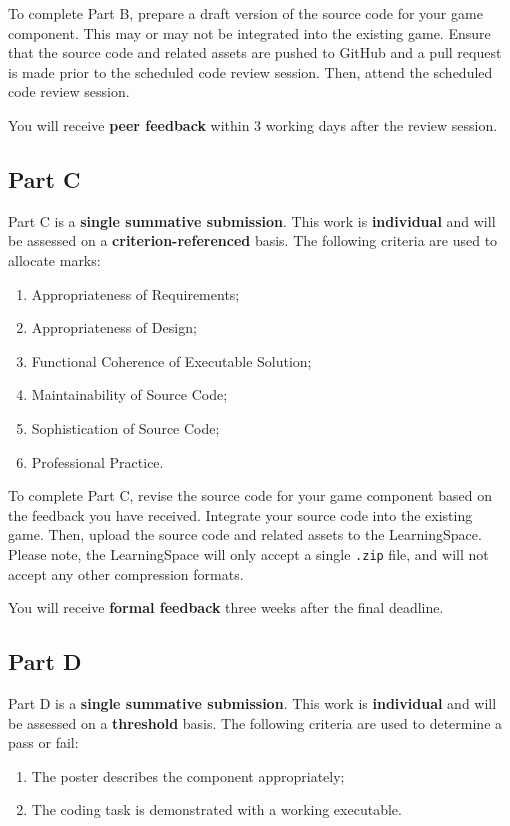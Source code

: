 \documentclass{../fal_assignment}
\begin{document}
To complete Part B, prepare a draft version of the source code for your game component. This may or may not be integrated into the existing game. Ensure that the source code and related assets are pushed to GitHub and a pull request is made prior to the scheduled code review session. Then, attend the scheduled code review session.

You will receive \textbf{peer feedback} within 3 working days after the review session.

\subsection*{Part C}

Part C is a \textbf{single summative submission}. This work is \textbf{individual} and will be assessed on a \textbf{criterion-referenced} basis. The following criteria are used to allocate marks:

\begin{enumerate}[label=(\alph*)]
	\item Appropriateness of Requirements;
	\item Appropriateness of Design;
	\item Functional Coherence of Executable Solution;
	\item Maintainability of Source Code;
	\item Sophistication of Source Code;
	\item Professional Practice.
\end{enumerate}

To complete Part C, revise the source code for your game component based on the feedback you have received. Integrate your source code into the existing game. Then, upload the source code and related assets to the LearningSpace. Please note, the LearningSpace will only accept a single \texttt{.zip} file, and will not accept any other compression formats.

You will receive \textbf{formal feedback} three weeks after the final deadline.

\subsection*{Part D}

Part D is a \textbf{single summative submission}. This work is \textbf{individual} and will be assessed on a \textbf{threshold} basis. The following criteria are used to determine a pass or fail:

\begin{enumerate}[label=(\alph*)]
	\item The poster describes the component appropriately;
	\item The coding task is demonstrated with a working executable.
\end{enumerate}
\end{document}
